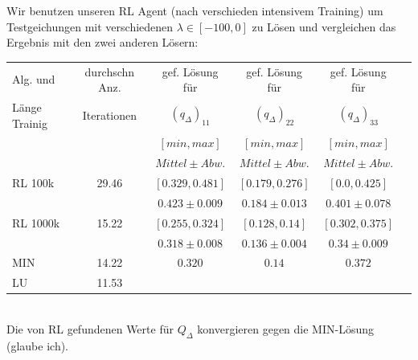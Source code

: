 \documentclass[]{article}
\begin{document}
Wir benutzen unseren RL Agent (nach verschieden intensivem Training) um Testgeichungen mit verschiedenen $\lambda \in [-100,0]$ zu Lösen und vergleichen das Ergebnis mit den zwei anderen Lösern:\\

\begin{tabular}{| l | c | c | c | c | c |}
	\hline	
	Alg. und & durchschn Anz.& gef. Lösung für & gef. Lösung für & gef. Lösung für\\
	Länge Trainig & Iterationen	& $(q_\Delta)_{11}$ & $(q_\Delta)_{22}$ & $(q_\Delta)_{33}$\\
	              &             & $[min,max]$ & $[min,max]$ & $[min,max]$ \\
	              &             & $Mittel\pm Abw.$ & $Mittel\pm Abw.$ & $Mittel\pm Abw.$ \\
	\hline			
	RL 100k & 29.46 & $[0.329, 0.481]$ & $[0.179, 0.276]$ & $[0.0, 0.425]$ \\
	        &       & $0.423 \pm 0.009$ & $0.184 \pm 0.013$ & $0.401 \pm 0.078$\\
	\hline
	RL 1000k & 15.22 & $[0.255, 0.324]$ & $[0.128, 0.14]$ & $[0.302, 0.375]$ \\
	         &       & $0.318 \pm 0.008$  & $0.136 \pm 0.004$ & $0.34 \pm 0.009$  \\	
	\hline			
	MIN & 14.22 &  $0.320$ & $0.14$ & $0.372$ \\
	\hline  	
	LU &  11.53 & & &  \\
	\hline  
\end{tabular}\\

Die von RL gefundenen Werte für $Q_\Delta$ konvergieren gegen die MIN-Lösung (glaube ich).
\end{document}
